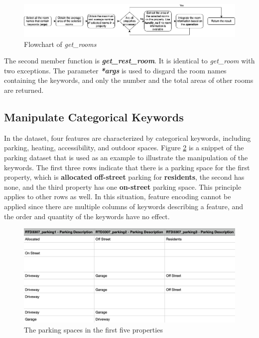 \documentclass[12pt,twoside]{report}
\begin{document}
\begin{figure}[!htbp]
	\centering
	\includegraphics[width=\linewidth]{extract_room_get_rooms}
	\caption{Flowchart of \textit{get\_rooms}}
	\label{extract_room_get_rooms}
\end{figure}

The second member function is \textit{\textbf{get\_rest\_room}}. It is identical to \textit{get\_room} with two exceptions. The parameter \textit{\textbf{*args}} is used to disgard the room names containing the keywords, and only the number and the total areas of other rooms are returned. 

\subsection{Manipulate Categorical Keywords}
In the dataset, four features are characterized by categorical keywords, including parking, heating, accessibility, and outdoor spaces. Figure \ref{parking_dataset} is a snippet of the parking dataset that is used as an example to illustrate the manipulation of the keywords. The first three rows indicate that there is a parking space for the first property, which is \textbf{allocated} \textbf{off-street} parking for \textbf{residents}, the second has none, and the third property has one \textbf{on-street} parking space. This principle applies to other rows as well. In this situation, feature encoding cannot be applied since there are multiple columns of keywords describing a feature, and the order and quantity of the keywords have no effect.
\\

\begin{figure}[!htbp]
	\centering
	\includegraphics[width=12cm]{parking_dataset}
	\caption{The parking spaces in the first five properties}
	\label{parking_dataset}
\end{figure}
\end{document}
